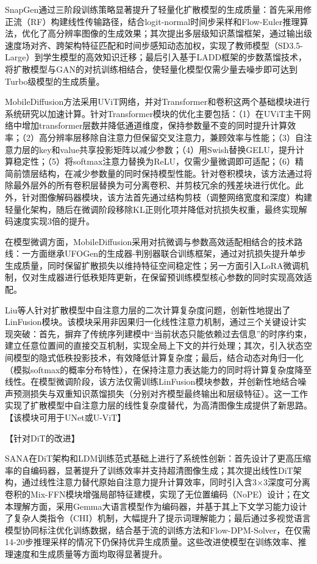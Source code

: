 \documentclass[11pt,a4paper,UTF8]{ctexart}
\begin{document}
SnapGen\cite{hu2024snapgen}通过三阶段训练策略显著提升了轻量化扩散模型的生成质量：首先采用修正流（RF）\cite{liu2022flow}构建线性传输路径，结合logit-normal时间步采样和Flow-Euler推理算法，优化了高分辨率图像的生成效果；其次提出多层级知识蒸馏框架，通过输出级速度场对齐、跨架构特征匹配和时间步感知动态加权，实现了教师模型（SD3.5-Large）到学生模型的高效知识迁移；最后引入基于LADD框架\cite{sauer2024fast}的步数蒸馏技术，将扩散模型与GAN的对抗训练相结合，使轻量化模型仅需少量去噪步即可达到Turbo级模型的生成质量。

MobileDiffusion\cite{zhao2024mobilediffusion}方法采用UViT网络，并对Transformer和卷积这两个基础模块进行系统研究以加速计算。针对Transformer模块的优化主要包括：（1）在UViT主干网络中增加transformer层数并降低通道维度，保持参数量不变的同时提升计算效率；（2）高分辨率层移除自注意力但保留交叉注意力，兼顾效率与性能；（3）自注意力层的key和value共享投影矩阵以减少参数；（4）用Swish替换GELU，提升计算稳定性；（5）将softmax注意力替换为ReLU，仅需少量微调即可适配；（6）精简前馈层结构，在减少参数量的同时保持模型性能。针对卷积模块，该方法通过将除最外层外的所有卷积层替换为可分离卷积\cite{howard2017mobilenets}、并剪枝冗余的残差块进行优化。此外，针对图像解码器模块，该方法首先通过结构剪枝（调整网络宽度和深度）构建轻量化架构，随后在微调阶段移除KL正则化项并降低对抗损失权重，最终实现解码速度实现3倍的提升。

在模型微调方面，MobileDiffusion\cite{zhao2024mobilediffusion}采用对抗微调与参数高效适配相结合的技术路线：一方面继承UFOGen\cite{xu2024ufogen}的生成器-判别器联合训练框架，通过对抗损失提升单步生成质量，同时保留扩散损失以维持特征空间稳定性；另一方面引入LoRA\cite{hu2022lora}微调机制，仅对生成器进行低秩矩阵更新，在保留预训练模型核心参数的同时实现高效适配。

Liu等人\cite{liu2024linfusion}针对扩散模型中自注意力层的二次计算复杂度问题，创新性地提出了LinFusion模块。该模块采用非因果归一化线性注意力机制，通过三个关键设计实现突破：首先，摒弃了传统序列建模中“当前状态只能依赖过去信息”的时序约束，建立任意位置间的直接交互机制，实现全局上下文的并行处理；其次，引入状态空间模型的隐式低秩投影技术，有效降低计算复杂度；最后，结合动态对角归一化（模拟softmax的概率分布特性），在保持注意力表达能力的同时将计算复杂度降至线性。在模型微调阶段，该方法仅需训练LinFusion模块参数，并创新性地结合噪声预测损失与双重知识蒸馏损失（分别对齐模型最终输出和层级特征）。这一工作实现了扩散模型中自注意力层的线性复杂度替代，为高清图像生成提供了新思路。【该模块可用于UNet或U-ViT】

【针对DiT的改进】

SANA\cite{xie2024sana}在DiT架构和LDM训练范式基础上进行了系统性创新：首先设计了更高压缩率的自编码器，显著提升了训练效率并支持超清图像生成；其次提出线性DiT架构，通过线性注意力替代原始自注意力提升计算效率，同时引入含3×3深度可分离卷积的Mix-FFN模块增强局部特征建模，实现了无位置编码（NoPE）设计；在文本理解方面，采用Gemma大语言模型\cite{team2024gemma}作为编码器，并基于其上下文学习能力设计了复杂人类指令（CHI）机制，大幅提升了提示词理解能力；最后通过多视觉语言模型协同标注优化训练数据，结合基于流的训练方法\cite{liu2022flow,karras2022elucidating}和Flow-DPM-Solver，在仅需14-20步推理采样的情况下仍保持优异生成质量。这些改进使模型在训练效率、推理速度和生成质量等方面均取得显著提升。
\end{document}
